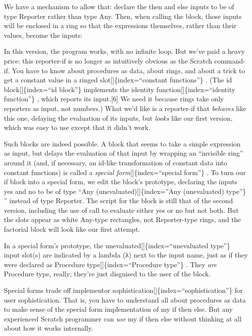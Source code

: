\documentclass[
  letterpaper,
]{book}
\begin{document}
We have a mechanism to allow that: declare the then and else inputs to
be of type Reporter rather than type Any. Then, when calling the block,
those inputs will be enclosed in a ring so that the expressions
themselves, rather than their values, become the inputs:

In this version, the program works, with no infinite loop. But we've
paid a heavy price: this reporter-if is no longer as intuitively obvious
as the Scratch command-if. You have to know about procedures as data,
about rings, and about a trick to get a constant value in a ringed
slot{[}{]}\{index=``constant functions''\} . (The id
block{[}{]}\{index=``id block''\} implements the identity
function{[}{]}\{index=``identity function''\} , which reports its
input.{[}6{]} We need it because rings take only reporters as input, not
numbers.) What we'd like is a reporter-if that \emph{behaves} like this
one, delaying the evaluation of its inputs, but \emph{looks} like our
ﬁrst version, which was easy to use except that it didn't work.

Such blocks are indeed possible. A block that seems to take a simple
expression as input, but delays the evaluation of that input by wrapping
an ``invisible ring'' around it (and, if necessary, an id-like
transformation of constant data into constant functions) is called a
\emph{special form}{[}{]}\{index=``special form''\} . To turn our if
block into a special form, we edit the block's prototype, declaring the
inputs yes and no to be of type ``Any (unevaluated){[}{]}\{index=''Any
(unevaluated) type''\} '' instead of type Reporter. The script for the
block is still that of the second version, including the use of call to
evaluate either yes or no but not both. But the slots appear as white
Any-type rectangles, not Reporter-type rings, and the factorial block
will look like our ﬁrst attempt.

In a special form's prototype, the
unevaluated{[}{]}\{index=``unevaluated type''\} input slot(s) are
indicated by a lambda (λ) next to the input name, just as if they were
declared as Procedure type{[}{]}\{index=``Procedure type''\} . They
\emph{are} Procedure type, really; they're just disguised to the user of
the block.

Special forms trade off implementor
sophistication{[}{]}\{index=``sophistication''\} for user
sophistication. That is, you have to understand all about procedures as
data to make sense of the special form implementation of my if then
else. But any experienced Scratch programmer can \emph{use} my if then
else without thinking at all about how it works internally.
\end{document}
